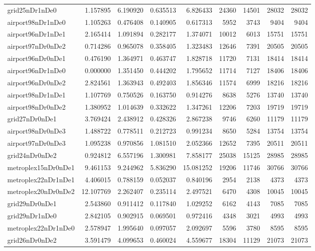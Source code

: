 \begin{longtable}{|l|r|r|r|r|r|r|r|r|}
grid25nDr1nDe0 & 1.157895 & 6.190920 & 0.635513 & 6.826433 & 24360 & 14501 & 28032 & 28032 \\
airport98nDr1nDe0 & 1.105263 & 0.476408 & 0.140905 & 0.617313 & 5952 & 3743 & 9404 & 9404 \\
airport96nDr1nDe1 & 2.165414 & 1.091894 & 0.282177 & 1.374071 & 10012 & 6013 & 15751 & 15751 \\
airport97nDr0nDe2 & 0.714286 & 0.965078 & 0.358405 & 1.323483 & 12646 & 7391 & 20505 & 20505 \\
airport96nDr0nDe1 & 0.476190 & 1.364971 & 0.463747 & 1.828718 & 11720 & 7131 & 18414 & 18414 \\
airport96nDr1nDe0 & 0.000000 & 1.351450 & 0.444202 & 1.795652 & 11714 & 7127 & 18406 & 18406 \\
airport96nDr0nDe2 & 2.824561 & 1.363943 & 0.492403 & 1.856346 & 11574 & 6999 & 18216 & 18216 \\
airport98nDr1nDe1 & 1.107769 & 0.750526 & 0.163750 & 0.914276 & 8638 & 5276 & 13740 & 13740 \\
airport98nDr0nDe2 & 1.380952 & 1.014639 & 0.332622 & 1.347261 & 12206 & 7203 & 19719 & 19719 \\
grid27nDr0nDe1 & 3.769424 & 2.438912 & 0.428326 & 2.867238 & 9746 & 6260 & 11179 & 11179 \\
airport98nDr0nDe3 & 1.488722 & 0.778511 & 0.212723 & 0.991234 & 8650 & 5284 & 13754 & 13754 \\
airport97nDr0nDe3 & 1.095238 & 0.970856 & 1.081510 & 2.052366 & 12652 & 7395 & 20511 & 20511 \\
grid24nDr0nDe2 & 0.924812 & 6.557196 & 1.300981 & 7.858177 & 25038 & 15125 & 28985 & 28985 \\
metroplex15nDr0nDe1 & 9.461153 & 9.244962 & 5.836290 & 15.081252 & 19206 & 11746 & 30766 & 30766 \\
metroplex22nDr1nDe1 & 4.406015 & 0.788159 & 0.052037 & 0.840196 & 2954 & 2138 & 4373 & 4373 \\
metroplex20nDr0nDe2 & 12.107769 & 2.262407 & 0.235114 & 2.497521 & 6470 & 4308 & 10045 & 10045 \\
grid29nDr0nDe1 & 2.543860 & 0.911412 & 0.117840 & 1.029252 & 6162 & 4143 & 7085 & 7085 \\
grid29nDr1nDe0 & 2.842105 & 0.902915 & 0.069501 & 0.972416 & 4348 & 3021 & 4993 & 4993 \\
metroplex22nDr1nDe0 & 2.578947 & 1.995640 & 0.097057 & 2.092697 & 5596 & 3780 & 8595 & 8595 \\
grid26nDr0nDe2 & 3.591479 & 4.099653 & 0.460024 & 4.559677 & 18304 & 11129 & 21073 & 21073 \\

\end{longtable}
